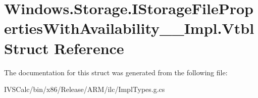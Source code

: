 \hypertarget{struct_windows_1_1_storage_1_1_i_storage_file_properties_with_availability_____impl_1_1_vtbl}{}\section{Windows.\+Storage.\+I\+Storage\+File\+Properties\+With\+Availability\+\_\+\+\_\+\+Impl.\+Vtbl Struct Reference}
\label{struct_windows_1_1_storage_1_1_i_storage_file_properties_with_availability_____impl_1_1_vtbl}


The documentation for this struct was generated from the following file\+:\begin{DoxyCompactItemize}
\item 
I\+V\+S\+Calc/bin/x86/\+Release/\+A\+R\+M/ilc/Impl\+Types.\+g.\+cs\end{DoxyCompactItemize}
